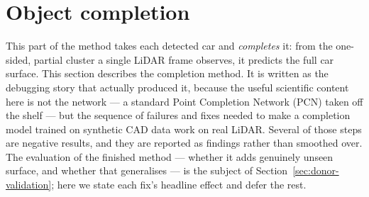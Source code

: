 %
%
%
%
\section{Object completion}
\label{ch:completion-method}

This part of the method takes each detected car and \emph{completes} it:
from the one-sided, partial cluster a single LiDAR frame observes, it predicts
the full car surface. This section describes the completion method. It is written
as the debugging story that actually produced it, because the useful scientific
content here is not the network --- a standard Point Completion Network (PCN)
taken off the shelf --- but the sequence of failures and fixes needed to make a
completion model trained on synthetic CAD data work on real LiDAR. Several of
those steps are negative results, and they are reported as findings rather than
smoothed over. The evaluation of the finished method --- whether it adds
genuinely unseen surface, and whether that generalises --- is the subject of
Section~\ref{sec:donor-validation}; here we state each fix's headline effect and defer the rest.


